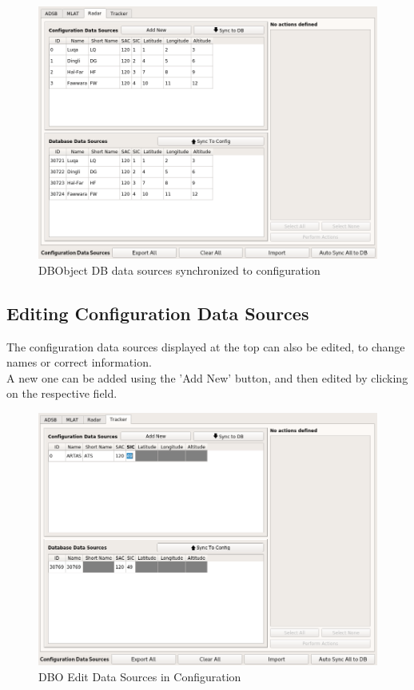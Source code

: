 \begin{figure}[H]
  \center
    \includegraphics[width=16cm,frame]{figures/manage_data_sources_edit_ds_db2cfgsynced.png}
  \caption{DBObject DB data sources synchronized to configuration }
\end{figure}

\subsection{Editing Configuration Data Sources}

The configuration data sources displayed at the top can also be edited, to change names or correct information. \\

A new one can be added using the 'Add New' button, and then edited by clicking on the respective field. \\

\begin{figure}[H]
  \center
    \includegraphics[width=16cm,frame]{figures/manage_data_sources_edit_ds_cfg.png}
  \caption{DBO Edit Data Sources in Configuration}
\end{figure}


